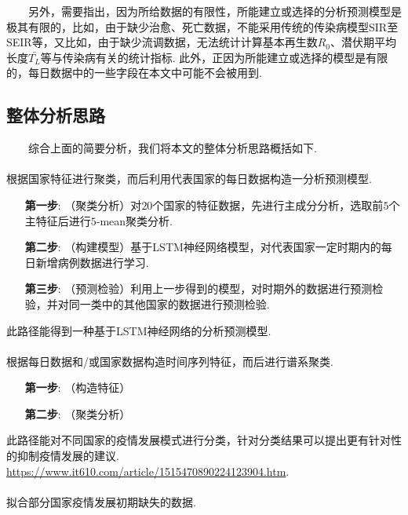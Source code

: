 \documentclass[a4paper, titlepage]{article}
\begin{document}
        　　另外，需要指出，因为所给数据的有限性，所能建立或选择的分析预测模型是极其有限的，比如，由于缺少治愈、死亡数据，不能采用传统的传染病模型SIR至SEIR等，又比如，由于缺少流调数据，无法统计计算基本再生数$R_0$、潜伏期平均长度$\bar{T_L}$等与传染病有关的统计指标. 此外，正因为所能建立或选择的模型是有限的，每日数据中的一些字段在本文中可能不会被用到.

        \subsection{整体分析思路}
        　　综合上面的简要分析，我们将本文的整体分析思路概括如下.

        \paragraph{} 根据国家特征进行聚类，而后利用代表国家的每日数据构造一分析预测模型.
        \begin{itemize}[itemsep=-1pt,topsep=1pt]
            \item [\textbf{第一步}:]（聚类分析）对$20$个国家的特征数据，先进行主成分分析，选取前$5$个主特征后进行$5$-mean聚类分析.
            \item [\textbf{第二步}:]（构建模型）基于LSTM神经网络模型，对代表国家一定时期内的每日新增病例数据进行学习.
            \item [\textbf{第三步}:]（预测检验）利用上一步得到的模型，对时期外的数据进行预测检验，并对同一类中的其他国家的数据进行预测检验.
        \end{itemize}
        此路径能得到一种基于LSTM神经网络的分析预测模型.

        \paragraph{} 根据每日数据和/或国家数据构造时间序列特征，而后进行谱系聚类.
        \begin{itemize}[itemsep=-1pt,topsep=1pt]
            \item [\textbf{第一步}:]（构造特征）
            \item [\textbf{第二步}:]（聚类分析）
        \end{itemize}
        此路径能对不同国家的疫情发展模式进行分类，针对分类结果可以提出更有针对性的抑制疫情发展的建议. \url{https://www.it610.com/article/1515470890224123904.htm}.
        
        \paragraph{} 拟合部分国家疫情发展初期缺失的数据.
\end{document}

